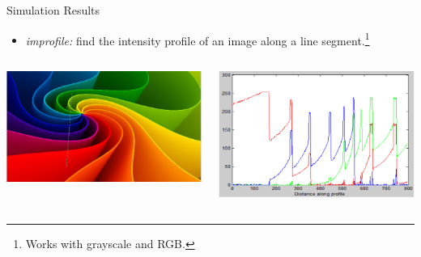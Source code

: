 \begin{frame}{Simulation Results}
    \begin{itemize}
        \item {\itshape improfile:} find the intensity profile of an image along a line segment.\footnote{Works with grayscale and RGB.}
    \end{itemize}

    \vfill

    \begin{columns}
        \begin{column}{0.45\textwidth}
            \includegraphics[width=\columnwidth]{figures/improfile1.png}
        \end{column}
        \hfill
        \begin{column}{0.45\textwidth}
            \includegraphics[width=0.95\columnwidth]{figures/improfile2.png}
        \end{column}
    \end{columns}
\end{frame}

